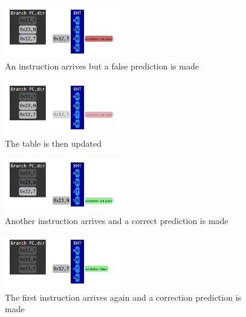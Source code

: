 \documentclass[12pt]{article}
\newenvironment{QandA}{\begin{enumerate}[label=\bfseries\arabic*.]\bfseries}
                      {\end{enumerate}}
\newenvironment{answered}{\par\quad\normalfont}{}
\begin{document}
\begin{QandA}
\begin{answered}
\begin{figure}[!ht]
\centering
\includegraphics[width=0.45\textwidth]{chapter7_imgs/bbp/bbp001.png}
\caption{An instruction arrives but a false prediction is made}
\label{bbp001}
\end{figure}

\begin{figure}[!ht]
\centering
\includegraphics[width=0.45\textwidth]{chapter7_imgs/bbp/bbp002.png}
\caption{The table is then updated}
\label{bbp002}
\end{figure}

\begin{figure}[!ht]
\centering
\includegraphics[width=0.45\textwidth]{chapter7_imgs/bbp/bbp003.png}
\caption{Another instruction arrives and a correct prediction is made}
\label{bbp003}
\end{figure}

\begin{figure}[!ht]
\centering
\includegraphics[width=0.45\textwidth]{chapter7_imgs/bbp/bbp004.png}
\caption{The first instruction arrives again and a correction prediction is made}
\label{bbp004}
\end{figure}
\end{answered}

\ 


\end{QandA}
\end{document}

